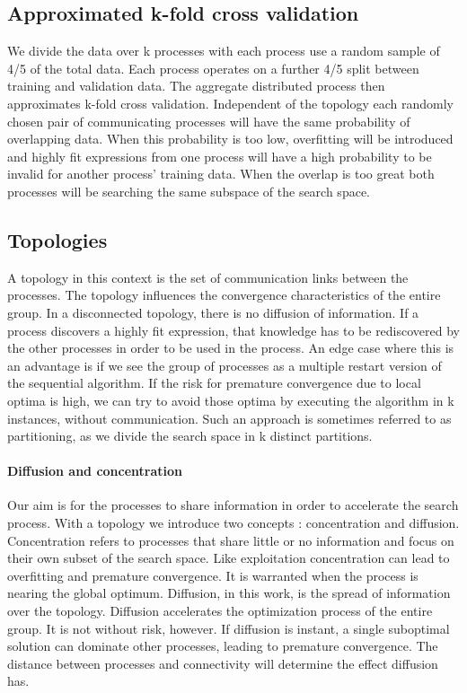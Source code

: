 \subsection{Approximated k-fold cross validation}
We divide the data over k processes with each process use a random sample of 4/5 of the total data. Each process operates on a further 4/5 split between training and validation data. The aggregate distributed process then approximates k-fold cross validation. Independent of the topology each randomly chosen pair of communicating processes will have the same probability of overlapping data. When this probability is too low, overfitting will be introduced and highly fit expressions from one process will have a high probability to be invalid for another process' training data. When the overlap is too great both processes will be searching the same subspace of the search space.
\subsection{Topologies}
A topology in this context is the set of communication links between the processes. The topology influences the convergence characteristics of the entire group. In a disconnected topology, there is no diffusion of information. If a process discovers a highly fit expression, that knowledge has to be rediscovered by the other processes in order to be used in the process. An edge case where this is an advantage is if we see the group of processes as a multiple restart version of the sequential algorithm. If the risk for premature convergence due to local optima is high, we can try to avoid those optima by executing the algorithm in k instances, without communication. Such an approach is sometimes referred to as partitioning, as we divide the search space in k distinct partitions.
\paragraph{Diffusion and concentration}
Our aim is for the processes to share information in order to accelerate the search process. With a topology we introduce two concepts : concentration and diffusion. Concentration refers to processes that share little or no information and focus on their own subset of the search space. Like exploitation concentration can lead to overfitting and premature convergence. It is warranted when the process is nearing the global optimum. Diffusion, in this work, is the spread of information over the topology. Diffusion accelerates the optimization process of the entire group. It is not without risk, however. If diffusion is instant, a single suboptimal solution can dominate other processes, leading to premature convergence. The distance between processes and connectivity will determine the effect diffusion has.
